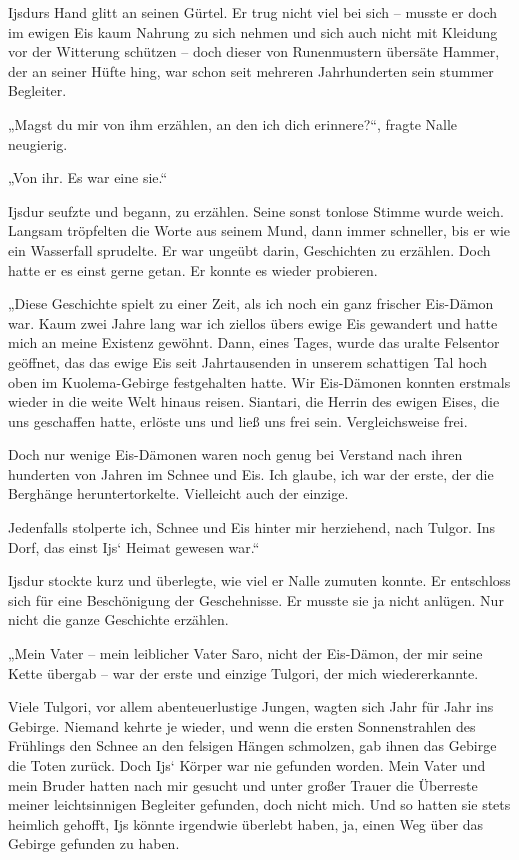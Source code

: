 Ijsdurs Hand glitt an seinen Gürtel. Er trug nicht viel bei sich – musste er doch im ewigen Eis kaum Nahrung zu sich nehmen und sich auch nicht mit Kleidung vor der Witterung schützen – doch dieser von Runenmustern übersäte Hammer, der an seiner Hüfte hing, war schon seit mehreren Jahrhunderten sein stummer Begleiter.

„Magst du mir von ihm erzählen, an den ich dich erinnere?“, fragte Nalle neugierig.

„Von ihr. Es war eine sie.“

Ijsdur seufzte und begann, zu erzählen. Seine sonst tonlose Stimme wurde weich. Langsam tröpfelten die Worte aus seinem Mund, dann immer schneller, bis er wie ein Wasserfall sprudelte. Er war ungeübt darin, Geschichten zu erzählen. Doch hatte er es einst gerne getan. Er konnte es wieder probieren.

„Diese Geschichte spielt zu einer Zeit, als ich noch ein ganz frischer Eis-Dämon war. Kaum zwei Jahre lang war ich ziellos übers ewige Eis gewandert und hatte mich an meine Existenz gewöhnt. Dann, eines Tages, wurde das uralte Felsentor geöffnet, das das ewige Eis seit Jahrtausenden in unserem schattigen Tal hoch oben im Kuolema-Gebirge festgehalten hatte. Wir Eis-Dämonen konnten erstmals wieder in die weite Welt hinaus reisen. Siantari, die Herrin des ewigen Eises, die uns geschaffen hatte, erlöste uns und ließ uns frei sein. Vergleichsweise frei.

Doch nur wenige Eis-Dämonen waren noch genug bei Verstand nach ihren hunderten von Jahren im Schnee und Eis. Ich glaube, ich war der erste, der die Berghänge heruntertorkelte. Vielleicht auch der einzige.

Jedenfalls stolperte ich, Schnee und Eis hinter mir herziehend, nach Tulgor. Ins Dorf, das einst Ijs‘ Heimat gewesen war.“

Ijsdur stockte kurz und überlegte, wie viel er Nalle zumuten konnte. Er entschloss sich für eine Beschönigung der Geschehnisse. Er musste sie ja nicht anlügen. Nur nicht die ganze Geschichte erzählen.

„Mein Vater – mein leiblicher Vater Saro, nicht der Eis-Dämon, der mir seine Kette übergab – war der erste und einzige Tulgori, der mich wiedererkannte.

Viele Tulgori, vor allem abenteuerlustige Jungen, wagten sich Jahr für Jahr ins Gebirge. Niemand kehrte je wieder, und wenn die ersten Sonnenstrahlen des Frühlings den Schnee an den felsigen Hängen schmolzen, gab ihnen das Gebirge die Toten zurück. Doch Ijs‘ Körper war nie gefunden worden. Mein Vater und mein Bruder hatten nach mir gesucht und unter großer Trauer die Überreste meiner leichtsinnigen Begleiter gefunden, doch nicht mich. Und so hatten sie stets heimlich gehofft, Ijs könnte irgendwie überlebt haben, ja, einen Weg über das Gebirge gefunden zu haben.

